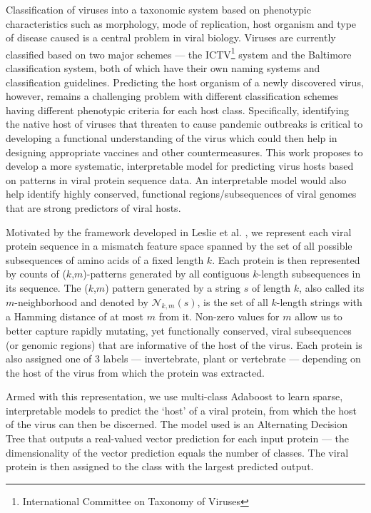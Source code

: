 Classification of viruses into a taxonomic system based on phenotypic characteristics
such as morphology, mode of replication, host organism and type of disease caused is
a central problem in viral biology. Viruses are currently classified based on two major
schemes --- the ICTV\footnote{International Committee on Taxonomy of Viruses} system
and the Baltimore classification system, both of which have their own naming systems
and classification guidelines. Predicting the host organism of a newly discovered virus,
however, remains a challenging problem with different classification schemes having
different phenotypic criteria for each host class. Specifically, identifying the native 
host of viruses that threaten to cause pandemic outbreaks is critical to developing a 
functional understanding of the virus which could then help in designing appropriate 
vaccines and other countermeasures. This work proposes to develop a more systematic, 
interpretable model for predicting virus hosts based on patterns in viral protein sequence data. 
An interpretable model would also help identify highly conserved, functional regions/subsequences 
of viral genomes that are strong predictors of viral hosts.

Motivated by the framework developed in Leslie et al. \cite{leslie}, we represent each viral protein
sequence in a mismatch feature space spanned by the set of all possible subsequences of amino acids
of a fixed length $k$. Each protein is then represented by counts of ($k$,$m$)-patterns
generated by all contiguous $k$-length subsequences in its sequence. The ($k$,$m$) pattern 
generated by a string $s$ of length $k$, also called its $m$-neighborhood and denoted by 
$\mathcal{N}_{k,m}(s)$, is the set of all $k$-length strings with a Hamming distance of
at most $m$ from it. Non-zero values for $m$ allow us to better capture rapidly mutating, 
yet functionally conserved, viral subsequences (or genomic regions) that are informative 
of the host of the virus. Each protein is also assigned one of 3 labels --- invertebrate, plant
or vertebrate --- depending on the host of the virus from which the protein was extracted.

Armed with this representation, we use multi-class Adaboost to learn sparse, interpretable
models to predict the `host' of a viral protein, from which the host of the virus can then
be discerned. The model used is an Alternating Decision Tree that outputs a real-valued vector 
prediction for each input protein --- the dimensionality of the vector prediction equals the number of 
classes. 
The viral protein is then assigned to the class with the largest predicted output.

